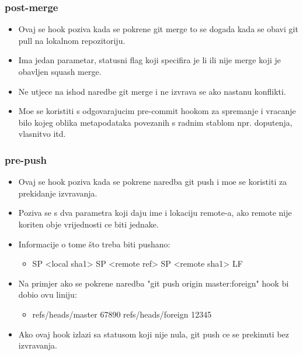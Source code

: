 \documentclass{beamer}
\begin{document}
\begin{frame}
\frametitle{post-merge}
\begin{itemize}
    \item Ovaj se hook poziva kada se pokrene git merge to se dogada kada se obavi git pull na lokalnom repozitoriju.
    \item Ima jedan parametar, statusni flag koji specifira je li ili nije merge koji je obavljen squash merge.
    \item Ne utjece na ishod naredbe git merge i ne izvrava se ako nastanu konflikti.
    \item Moe se koristiti s odgovarajucim pre-commit hookom za spremanje i vracanje bilo kojeg oblika metapodataka povezanih s radnim stablom npr. doputenja, vlasnitvo itd.
\end{itemize}
\end{frame}

\begin{frame}
\frametitle{pre-push}
\begin{itemize}
    \item Ovaj se hook poziva kada se pokrene naredba git push i moe se koristiti za prekidanje izvravanja.
    \item Poziva se s dva parametra koji daju ime i lokaciju remote-a, ako remote nije koriten obje vrijednosti ce biti jednake. 
    \item Informacije o tome što treba biti pushano:
    \begin{itemize}
        \item <local ref> SP <local sha1> SP <remote ref> SP <remote sha1> LF
    \end{itemize}
    \item Na primjer ako se pokrene naredba "git push origin master:foreign" hook bi dobio ovu liniju:
    \begin{itemize}
        \item refs/heads/master 67890 refs/heads/foreign 12345
    \end{itemize} 
    \item Ako ovaj hook izlazi sa statusom koji nije nula, git push ce se prekinuti bez izvravanja.
\end{itemize}
\end{frame}
\end{document}
